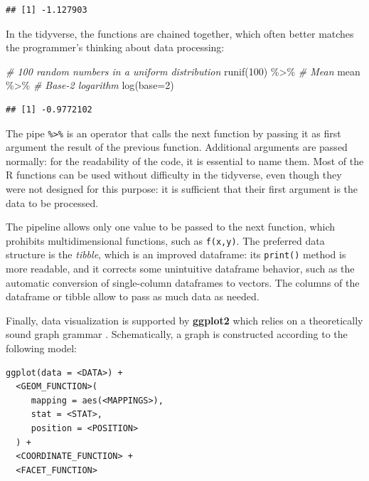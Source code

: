 \documentclass[
  12pt,
  american,
  a4paper,
  extrafontsizes,onecolumn,openright
  ]{memoir}
\newenvironment{Shaded}{\begin{snugshade}}{\end{snugshade}}
\newcommand{\AttributeTok}[1]{\textcolor[rgb]{0.77,0.63,0.00}{#1}}
\newcommand{\CommentTok}[1]{\textcolor[rgb]{0.56,0.35,0.01}{\textit{#1}}}
\newcommand{\DecValTok}[1]{\textcolor[rgb]{0.00,0.00,0.81}{#1}}
\newcommand{\FunctionTok}[1]{\textcolor[rgb]{0.00,0.00,0.00}{#1}}
\newcommand{\NormalTok}[1]{#1}
\newcommand{\SpecialCharTok}[1]{\textcolor[rgb]{0.00,0.00,0.00}{#1}}
\begin{document}
\begin{verbatim}
## [1] -1.127903
\end{verbatim}

\normalsize

In the tidyverse, the functions are chained together, which often better matches the programmer's thinking about data processing:

\scriptsize

\begin{Shaded}
\begin{Highlighting}[]
\CommentTok{\# 100 random numbers in a uniform distribution}
\FunctionTok{runif}\NormalTok{(}\DecValTok{100}\NormalTok{) }\SpecialCharTok{\%\textgreater{}\%} 
  \CommentTok{\# Mean}
\NormalTok{  mean }\SpecialCharTok{\%\textgreater{}\%} 
  \CommentTok{\# Base{-}2 logarithm}
  \FunctionTok{log}\NormalTok{(}\AttributeTok{base=}\DecValTok{2}\NormalTok{)}
\end{Highlighting}
\end{Shaded}

\begin{verbatim}
## [1] -0.9772102
\end{verbatim}

\normalsize

The pipe \texttt{\%\textgreater{}\%} is an operator that calls the next function by passing it as first argument the result of the previous function.
Additional arguments are passed normally: for the readability of the code, it is essential to name them.
Most of the R functions can be used without difficulty in the tidyverse, even though they were not designed for this purpose: it is sufficient that their first argument is the data to be processed.

The pipeline allows only one value to be passed to the next function, which prohibits multidimensional functions, such as \texttt{f(x,y)}.
The preferred data structure is the \emph{tibble}, which is an improved dataframe: its \texttt{print()} method is more readable, and it corrects some unintuitive dataframe behavior, such as the automatic conversion of single-column dataframes to vectors.
The columns of the dataframe or tibble allow to pass as much data as needed.

Finally, data visualization is supported by \textbf{ggplot2} which relies on a theoretically sound graph grammar \autocite{Wickham2010}.
Schematically, a graph is constructed according to the following model:

\begin{verbatim}
ggplot(data = <DATA>) + 
  <GEOM_FUNCTION>(
     mapping = aes(<MAPPINGS>),
     stat = <STAT>, 
     position = <POSITION>
  ) +
  <COORDINATE_FUNCTION> +
  <FACET_FUNCTION>
\end{verbatim}
\end{document}
